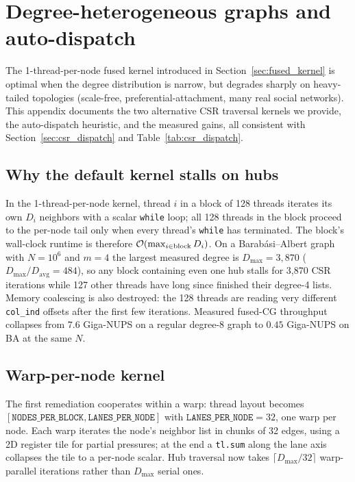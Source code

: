 \section{Degree-heterogeneous graphs and auto-dispatch}
\label{app:degree_dispatch}

The 1-thread-per-node fused kernel introduced in Section~\ref{sec:fused_kernel} is optimal when the degree distribution is narrow, but degrades sharply on heavy-tailed topologies (scale-free, preferential-attachment, many real social networks). This appendix documents the two alternative CSR traversal kernels we provide, the auto-dispatch heuristic, and the measured gains, all consistent with Section~\ref{sec:csr_dispatch} and Table~\ref{tab:csr_dispatch}.

\subsection{Why the default kernel stalls on hubs}

In the 1-thread-per-node kernel, thread $i$ in a block of 128 threads iterates its own $D_i$ neighbors with a scalar \texttt{while} loop; all 128 threads in the block proceed to the per-node tail only when every thread's \texttt{while} has terminated. The block's wall-clock runtime is therefore $\mathcal{O}(\max_{i \in \text{block}} D_i)$. On a Barab\'{a}si--Albert graph with $N = 10^6$ and $m = 4$ the largest measured degree is $D_{\max} = 3{,}870$ ($D_{\max}/D_{\mathrm{avg}} = 484$), so any block containing even one hub stalls for 3{,}870 CSR iterations while 127 other threads have long since finished their degree-4 lists. Memory coalescing is also destroyed: the 128 threads are reading very different \texttt{col\_ind} offsets after the first few iterations. Measured fused-CG throughput collapses from $7.6$ Giga-NUPS on a regular degree-8 graph to $0.45$ Giga-NUPS on BA at the same $N$.

\subsection{Warp-per-node kernel}
\label{app:warp_kernel}

The first remediation cooperates within a warp: thread layout becomes $[\texttt{NODES\_PER\_BLOCK}, \texttt{LANES\_PER\_NODE}]$ with $\texttt{LANES\_PER\_NODE} = 32$, one warp per node. Each warp iterates the node's neighbor list in chunks of 32 edges, using a 2D register tile for partial pressures; at the end a \texttt{tl.sum} along the lane axis collapses the tile to a per-node scalar. Hub traversal now takes $\lceil D_{\max} / 32 \rceil$ warp-parallel iterations rather than $D_{\max}$ serial ones.

